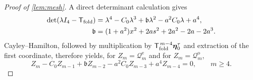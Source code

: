 \documentclass[review,hidelinks,onefignum,onetabnum]{siamart251216}
\begin{document}
\begin{proof}[Proof of \cref{lem:mesh}]
A direct determinant calculation gives
\begin{equation}\label{eq:fold-transfer-characteristic}
\begin{aligned}
 \det(\lambda I_4-\mathsf T_{\rm fold})
 &=
 \lambda^4-C_0\lambda^3+\mathfrak b\lambda^2
 -a^2C_0\lambda+a^4,\\
 \mathfrak b
 &=(1+a^2)x^2+2as^2+2a^2-2a-2a^3.
\end{aligned}
\end{equation}
Cayley--Hamilton, followed by multiplication by
\(\mathsf T_{\rm fold}^{\,m-4}\boldsymbol\eta_0^\tau\) and extraction
of the first coordinate, therefore yields, for
\(Z_m=\mathcal Q_m^{\mathrm e}\) and for
\(Z_m=\mathcal Q_m^{\mathrm o}\),
\begin{equation}\label{eq:fold-recurrence}
 Z_m-C_0Z_{m-1}+\mathfrak bZ_{m-2}
 -a^2C_0Z_{m-3}+a^4Z_{m-4}=0,
 \qquad m\geq4.
\end{equation}


\end{proof}
\end{document}

